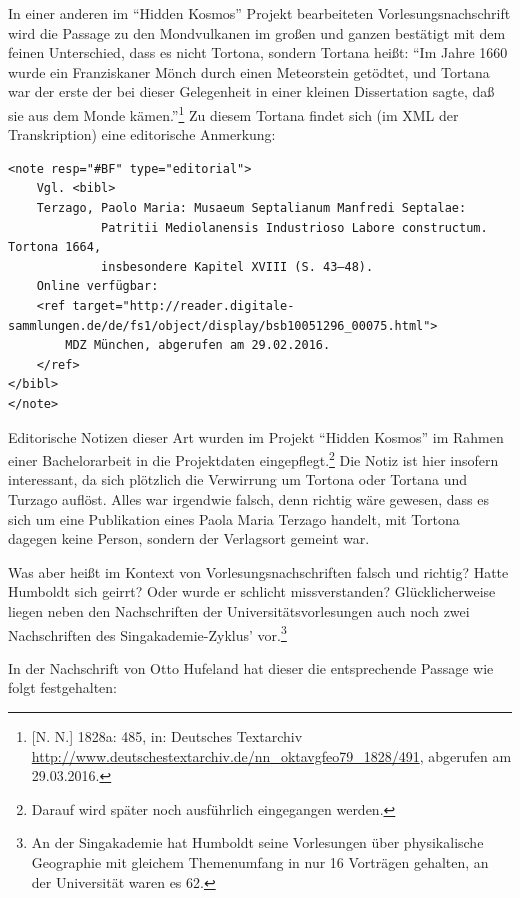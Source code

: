 \documentclass[output=paper]{langsci/langscibook}
\begin{document}
In einer anderen im \enquote{Hidden Kosmos} Projekt bearbeiteten
Vorlesungsnachschrift wird die Passage zu den Mondvulkanen im großen und
ganzen bestätigt mit dem feinen Unterschied, dass es nicht Tortona,
sondern Tortana heißt: \enquote{Im Jahre 1660 wurde ein Franziskaner
Mönch durch einen Meteorstein getödtet, und Tortana war der erste der
bei dieser Gelegenheit in einer kleinen Dissertation sagte, daß sie aus
dem Monde kämen.}\footnote{{[}N. N.{]} 1828a: 485, in: Deutsches
  Textarchiv
  \url{http://www.deutschestextarchiv.de/nn_oktavgfeo79_1828/491},
  abgerufen am 29.03.2016.} Zu diesem Tortana findet sich (im XML der
Transkription) eine editorische Anmerkung:


\begin{scriptsize}
\begin{verbatim}
<note resp="#BF" type="editorial">
    Vgl. <bibl>
    Terzago, Paolo Maria: Musaeum Septalianum Manfredi Septalae: 
             Patritii Mediolanensis Industrioso Labore constructum. Tortona 1664, 
             insbesondere Kapitel XVIII (S. 43–48).
    Online verfügbar: 
    <ref target="http://reader.digitale-sammlungen.de/de/fs1/object/display/bsb10051296_00075.html">
        MDZ München, abgerufen am 29.02.2016.
    </ref>
</bibl>
</note>
\end{verbatim}
\end{scriptsize}

Editorische Notizen dieser Art wurden im Projekt \enquote{Hidden Kosmos}
im Rahmen einer Bachelorarbeit in die Projektdaten
eingepflegt.\footnote{Darauf wird später noch ausführlich eingegangen
  werden.} Die Notiz ist hier insofern interessant, da sich plötzlich
die Verwirrung um Tortona oder Tortana und Turzago auflöst. Alles war
irgendwie falsch, denn richtig wäre gewesen, dass es sich um eine
Publikation eines Paola Maria Terzago handelt, mit Tortona dagegen keine
Person, sondern der Verlagsort gemeint war.

Was aber heißt im Kontext von Vorlesungsnachschriften falsch und
richtig? Hatte Humboldt sich geirrt? Oder wurde er schlicht
missverstanden? Glücklicherweise liegen neben den Nachschriften der
Universitätsvorlesungen auch noch zwei Nachschriften des
Singakademie-Zyklus' vor.\footnote{An der Singakademie hat Humboldt
  seine Vorlesungen über physikalische Geographie mit gleichem
  Themenumfang in nur 16 Vorträgen gehalten, an der Universität waren es
  62.}

In der Nachschrift von Otto Hufeland hat dieser die entsprechende
Passage wie folgt festgehalten:
\end{document}
